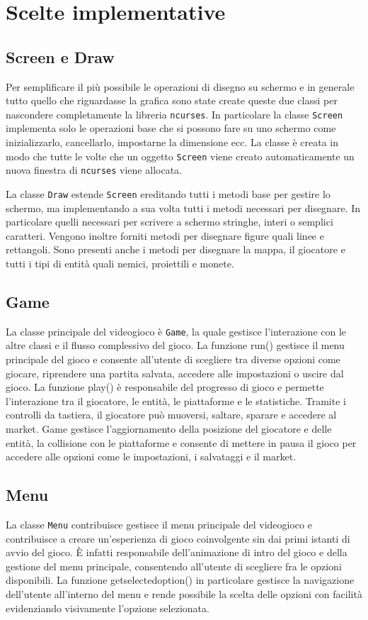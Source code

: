 \documentclass[a4paper]{article}
\begin{document}
\section{Scelte implementative}
\subsection{Screen e Draw}
Per semplificare il più possibile le operazioni di disegno su schermo e in 
generale tutto quello che riguardasse la grafica sono state create queste due
classi per nascondere completamente la libreria \texttt{ncurses}. In particolare
la classe \texttt{Screen} implementa solo le operazioni base che si possono fare
su uno schermo come inizializzarlo, cancellarlo, impostarne la dimensione ecc.
La classe è creata in modo che tutte le volte che un oggetto \texttt{Screen} 
viene creato automaticamente un nuova finestra di \texttt{ncurses} viene 
allocata.

La classe \texttt{Draw} estende \texttt{Screen} ereditando tutti i metodi base
per gestire lo schermo, ma implementando a sua volta tutti i metodi necessari 
per disegnare. In particolare quelli necessari per scrivere a schermo stringhe, 
interi o semplici caratteri. Vengono inoltre forniti metodi per disegnare figure 
quali linee e rettangoli. Sono presenti anche i metodi per disegnare la mappa, 
il giocatore e tutti i tipi di entità quali nemici, proiettili e monete.

\subsection{Game}
La classe principale del videogioco è \texttt{Game}, la quale gestisce l’interazione
con le altre classi e il flusso complessivo del gioco. La funzione run() gestisce 
il menu principale del gioco e consente all’utente di scegliere tra diverse opzioni 
come giocare, riprendere una partita salvata, accedere alle impostazioni o uscire dal gioco. 
La funzione play() è responsabile del progresso di gioco e permette l’interazione tra 
il giocatore, le entità, le piattaforme e le statistiche. Tramite i controlli da tastiera, 
il giocatore può muoversi, saltare, sparare e accedere al market. Game gestisce 
l’aggiornamento della posizione del giocatore e delle entità, la collisione con le piattaforme
e consente di mettere in pausa il gioco per accedere alle opzioni come le impostazioni, 
i salvataggi e il market.

\subsection{Menu}
La classe \texttt{Menu} contribuisce gestisce il menu principale del videogioco e contribuisce 
a creare un’esperienza di gioco coinvolgente sin dai primi istanti di avvio del gioco. 
È infatti responsabile dell’animazione di intro del gioco e della gestione del menu principale,
consentendo all’utente di scegliere fra le opzioni disponibili. La funzione getselectedoption()
in particolare gestisce la navigazione dell’utente all’interno del menu e rende possibile la
scelta delle opzioni con facilità evidenziando visivamente l’opzione selezionata. 
\end{document}
